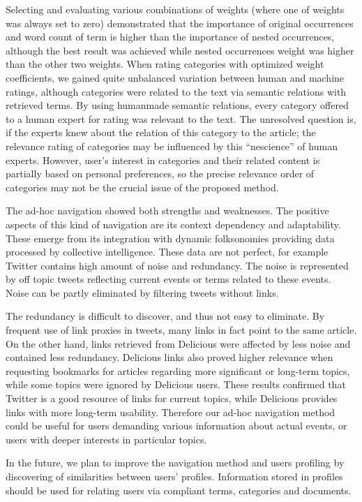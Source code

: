 \documentclass{llncs}
\begin{document}
Selecting and evaluating various combinations of weights (where one of weights was always set to zero) demonstrated that the importance of original occurrences and word count of term is higher than the importance of nested occurrences, although the best result was achieved while nested occurrences weight was higher than the other two weights. When rating categories with optimized weight coefficients, we gained quite unbalanced variation between human and machine ratings, although categories were related to the text via semantic relations with retrieved terms. By using humanmade semantic relations, every category offered to a human expert for rating was relevant to the text. The unresolved question is, if the experts knew about the relation of this category to the article; the relevance rating of categories may be influenced by this “nescience” of human experts. However, user's interest in categories and their related content is partially based on personal preferences, so the precise relevance order of categories may not be the crucial issue of the proposed method. 

The ad-hoc navigation showed both strengths and weaknesses. The positive aspects of this kind of navigation are its context dependency and adaptability. These emerge from its integration with dynamic folksonomies providing data processed by collective intelligence. These data are not perfect, for example Twitter contains high amount of noise and redundancy. The noise is represented by off topic tweets reflecting current events or terms related to these events. Noise can be partly eliminated by filtering tweets without links.  

The redundancy is difficult to discover, and thus not easy to eliminate. By frequent use of link proxies in tweets, many links in fact point to the same article. On the other hand, links retrieved from Delicious were affected by less noise and contained less redundancy. Delicious links also proved higher relevance when requesting bookmarks for articles regarding more significant or long-term topics, while some topics were ignored by Delicious users. These results confirmed that Twitter is a good resource of links for current topics, while Delicious provides links with more long-term usability. Therefore our ad-hoc navigation method could be useful for users demanding various information about actual events, or users with deeper interests in particular topics. 

In the future, we plan to improve the navigation method and users profiling by discovering of similarities between users' profiles. Information stored in profiles should be used for relating users via compliant terms, categories and documents. 
\end{document}
